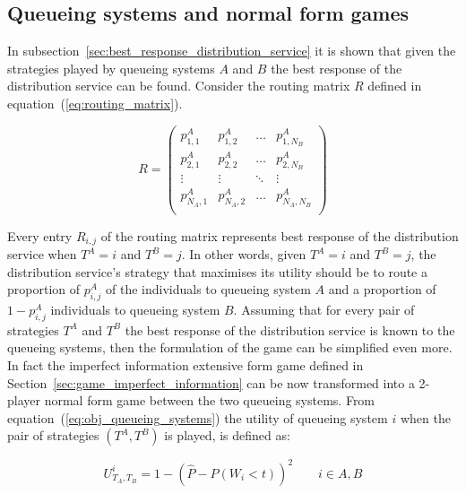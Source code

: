 \subsection{Queueing systems and normal form games}
\label{sec:queueing_systems_and_normal_form_games}

In subsection~\ref{sec:best_response_distribution_service} it is shown that
given the strategies played by queueing systems \(A\) and \(B\) the best
response of the distribution service can be found.
Consider the routing matrix \(R\) defined in equation~(\ref{eq:routing_matrix}).

\begin{equation*}
    R =
    \begin{pmatrix}
        p_{1,1}^A & p_{1,2}^A & \dots & p_{1,N_B}^A \\
        p_{2,1}^A & p_{2,2}^A & \dots & p_{2,N_B}^A \\
        \vdots & \vdots & \ddots & \vdots \\
        p_{N_A,1}^A & p_{N_A,2}^A & \dots & p_{N_A,N_B}^A \\
    \end{pmatrix}
\end{equation*}

Every entry \(R_{i,j}\) of the routing matrix represents best response of
the distribution service when \(T^A=i\) and \(T^B=j\).
In other words, given \(T^A=i\) and \(T^B=j\), the distribution service's
strategy that maximises its utility should be to route a proportion of
\(p^A_{i,j}\) of the individuals to queueing system \(A\) and a proportion of
\(1 - p^A_{i,j}\) individuals to queueing system \(B\).
Assuming that for every pair of strategies \(T^A\) and \(T^B\) the best response
of the distribution service is known to the queueing systems, then the
formulation of the game can be simplified even more.
In fact the imperfect information extensive form game defined in
Section~\ref{sec:game_imperfect_information} can be now transformed into a
2-player normal form game between the two queueing systems.
From equation~(\ref{eq:obj_queueing_systems}) the utility of queueing system
\(i\) when the pair of strategies \((T^A, T^B)\) is played, is defined as:

\begin{equation}\label{eq:utility_queueing_systems}
    U_{T_A, T_B}^i = 1 - \left( \hat{P} - P(W_i < t) \right)^2
    \qquad i \in {A, B}
\end{equation}


